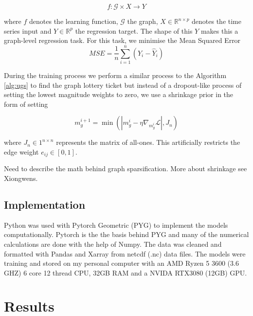 \documentclass[honours,12pt]{unswthesis}
\newcommand{\R}{\mathbb{R}}
\numberwithin{equation}{section}
\begin{document}
\begin{equation}
f : \mathcal{G} \times X \rightarrow Y
\end{equation}

\noindent where $f$ denotes the learning function, $\mathcal{G}$ the graph, $X \in \R^{n \times p}$ denotes the time series input and $Y \in \R^p$ the regression target.
The shape of this $Y$ makes this a graph-level regression task. For this task, we minimise the Mean Squared Error 
$$ MSE = \frac{1}{n} \sum_{i=1}^{n} (Y_i - \hat{Y}_i)$$

{\noindent}During the training process we perform a similar process to the Algorithm \ref{alg:ugs} to find the graph lottery ticket but instead of a dropout-like process
of setting the lowest magnitude weights to zero, we use a shrinkage prior in the form of setting

\begin{equation}
    m_g^{i+1} = \min(|m_g^i - \eta \nabla_{m_g^i} \mathcal{L}|, J_n)
\end{equation}

\noindent where $J_n \in 1^{n\times n}$ represents the matrix of all-ones. This artificially restricts the edge weight $e_{ij} \in [0, 1]$.

Need to describe the math behind graph sparsification. More about shrinkage see Xiongwens.


{\section{Implementation}}\label{implementation}

{\noindent}Python was used with Pytorch Geometric (PYG) to implement the models computationally.
Pytorch is the the basis behind PYG and many of the numerical calculations are done with the help of Numpy.
The data was cleaned and formatted with Pandas and Xarray from netcdf (.nc) data files.
The models were training and stored on my personal computer with an AMD Ryzen 5 3600 (3.6 GHZ) 6 core 12 thread CPU, 32GB RAM and a NVIDA RTX3080 (12GB) GPU. 

\chapter{Results}\label{results}
\end{document}
